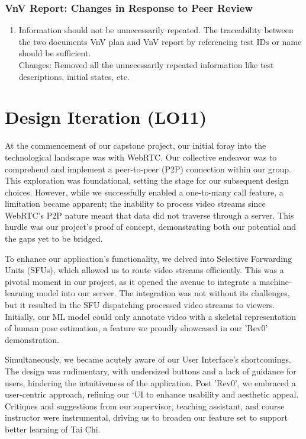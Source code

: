 \documentclass{article}
\begin{document}
\subsubsection{VnV Report: Changes in Response to Peer Review}
\begin{enumerate}
        \item Information should not be unnecessarily repeated. The traceability between the two documents VnV plan and VnV report by referencing test IDs or name should be sufficient. \\
        Changes: Removed all the unnecessarily repeated information like test descriptions, initial states, etc.
\end{enumerate} 


\section{Design Iteration (LO11)}
At the commencement of our capstone project, our initial foray into the technological landscape was with WebRTC. 
Our collective endeavor was to comprehend and implement a peer-to-peer (P2P) connection within our group. 
This exploration was foundational, setting the stage for our subsequent design choices. 
However, while we successfully enabled a one-to-many call feature, a limitation became apparent; the inability to process video streams since WebRTC's P2P nature meant that data did not traverse through a server. 
This hurdle was our project's proof of concept, demonstrating both our potential and the gaps yet to be bridged.

To enhance our application's functionality, we delved into Selective Forwarding Units (SFUs), which allowed us to route video streams efficiently. 
This was a pivotal moment in our project, as it opened the avenue to integrate a machine-learning model into our server. 
The integration was not without its challenges, but it resulted in the SFU dispatching processed video streams to viewers. 
Initially, our ML model could only annotate video with a skeletal representation of human pose estimation, a feature we proudly showcased in our 'Rev0' demonstration.

Simultaneously, we became acutely aware of our User Interface's shortcomings. The design was rudimentary, with undersized buttons and a lack of guidance for users, hindering the intuitiveness of the application. 
Post 'Rev0', we embraced a user-centric approach, refining our `UI to enhance usability and aesthetic appeal. 
Critiques and suggestions from our supervisor, teaching assistant, and course instructor were instrumental, driving us to broaden our feature set to support better learning of Tai Chi.
\end{document}
